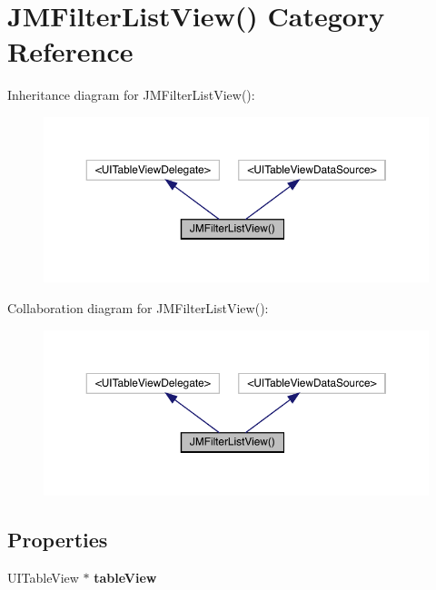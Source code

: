 \hypertarget{category_j_m_filter_list_view_07_08}{}\section{J\+M\+Filter\+List\+View() Category Reference}
\label{category_j_m_filter_list_view_07_08}


Inheritance diagram for J\+M\+Filter\+List\+View()\+:\nopagebreak
\begin{figure}[H]
\begin{center}
\leavevmode
\includegraphics[width=350pt]{category_j_m_filter_list_view_07_08__inherit__graph}
\end{center}
\end{figure}


Collaboration diagram for J\+M\+Filter\+List\+View()\+:\nopagebreak
\begin{figure}[H]
\begin{center}
\leavevmode
\includegraphics[width=350pt]{category_j_m_filter_list_view_07_08__coll__graph}
\end{center}
\end{figure}
\subsection*{Properties}
\begin{DoxyCompactItemize}
\item 
\mbox{\label{category_j_m_filter_list_view_07_08_a37c3d50f3346e0b191b301bd96e54a6b}} 
U\+I\+Table\+View $\ast$ {\bfseries table\+View}
\end{DoxyCompactItemize}


